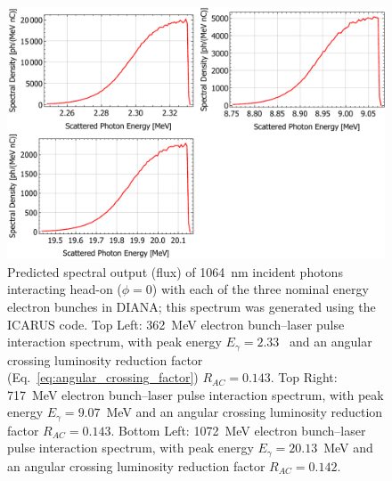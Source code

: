 \documentclass[../main.tex]{subfiles}
\begin{document}
\begin{figure}[!h]
\centering
\includegraphics[width=\textwidth]{Figures/DIANA_Inverse_Compton_Source_Design/DIANA_spectra.pdf}
\caption{Predicted spectral output (flux) of 1064~\si{\nano\meter} incident photons interacting head-on ($\phi=0$) with each of the three nominal energy electron bunches in DIANA; this spectrum was generated using the \textsc{ICARUS} code. Top Left: 362~\si{\mega\electronvolt}  electron bunch--laser pulse interaction spectrum, with peak energy $E_{\gamma}=2.33$~\si{\megaelectronvolt} and an angular crossing luminosity reduction factor (Eq.~\ref{eq:angular_crossing_factor}) $R_{AC}=0.143$. Top Right: 717~\si{\mega\electronvolt}  electron bunch--laser pulse interaction spectrum, with peak energy $E_{\gamma}=9.07$~\si{\mega\electronvolt} and an angular crossing luminosity reduction factor  $R_{AC}=0.143$. Bottom Left: 1072~\si{\mega\electronvolt}  electron bunch--laser pulse interaction spectrum, with peak energy $E_{\gamma}=20.13$~\si{\mega\electronvolt} and an angular crossing luminosity reduction factor  $R_{AC}=0.142$.}
\label{fig:DIANA_spectra}
\end{figure}
\end{document}
